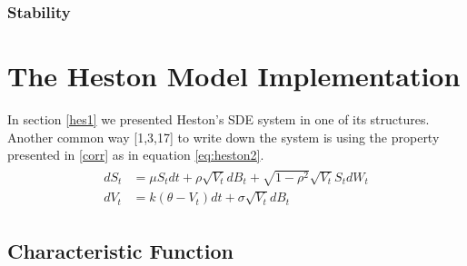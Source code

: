 \documentclass[12pt,twoside]{reedthesis}
\theoremstyle{definition}
\theoremstyle{definition}
\theoremstyle{remark}
\begin{document}
  \subsection{Stability}\label{stability}
  
  \chapter{The Heston Model
  Implementation}\label{the-heston-model-implementation}
  
  In section \ref{hes1} we presented Heston's SDE system in one of its
  structures. Another common way {[}1,3,17{]} to write down the system is
  using the property presented in \ref{corr} as in equation
  \eqref{eq:heston2}.
  \begin{align}
  \label{eq:heston2}
  \begin{split}
  dS_t &= \mu S_t dt + \rho \sqrt{V_t} dB_t + \sqrt{1 - \rho^2} \sqrt{V_t} S_t dW_t \\
  dV_t &= k(\theta - V_t)dt + \sigma \sqrt{V_t} dB_t 
  \end{split}
  \end{align}
  \section{Characteristic Function}\label{characteristic-function}
  
\end{document}
